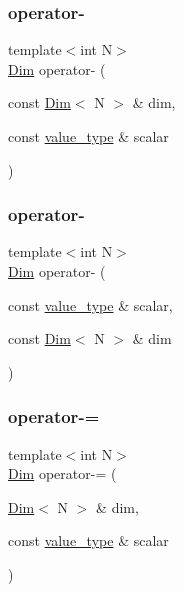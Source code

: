 \subsubsection{\texorpdfstring{operator-\/}{operator-}\hspace{0.1cm}{\footnotesize\ttfamily [1/2]}}
{\footnotesize\ttfamily template$<$int N$>$ \\
\hyperlink{structbc_1_1Dim}{Dim} operator-\/ (\begin{DoxyParamCaption}\item[{const \hyperlink{structbc_1_1Dim}{Dim}$<$ N $>$ \&}]{dim,  }\item[{const \hyperlink{structbc_1_1Dim_af59ff554825273cf6bd9619b2c78c196}{value\+\_\+type} \&}]{scalar }\end{DoxyParamCaption})\hspace{0.3cm}{\ttfamily [friend]}}

\mbox{\label{structbc_1_1Dim_aeec20ddee837bae3c689cb4ddab3a0cd}} 
\subsubsection{\texorpdfstring{operator-\/}{operator-}\hspace{0.1cm}{\footnotesize\ttfamily [2/2]}}
{\footnotesize\ttfamily template$<$int N$>$ \\
\hyperlink{structbc_1_1Dim}{Dim} operator-\/ (\begin{DoxyParamCaption}\item[{const \hyperlink{structbc_1_1Dim_af59ff554825273cf6bd9619b2c78c196}{value\+\_\+type} \&}]{scalar,  }\item[{const \hyperlink{structbc_1_1Dim}{Dim}$<$ N $>$ \&}]{dim }\end{DoxyParamCaption})\hspace{0.3cm}{\ttfamily [friend]}}

\mbox{\label{structbc_1_1Dim_add38db9cb6c5ca7444b9e4421d29ee3a}} 
\subsubsection{\texorpdfstring{operator-\/=}{operator-=}}
{\footnotesize\ttfamily template$<$int N$>$ \\
\hyperlink{structbc_1_1Dim}{Dim} operator-\/= (\begin{DoxyParamCaption}\item[{\hyperlink{structbc_1_1Dim}{Dim}$<$ N $>$ \&}]{dim,  }\item[{const \hyperlink{structbc_1_1Dim_af59ff554825273cf6bd9619b2c78c196}{value\+\_\+type} \&}]{scalar }\end{DoxyParamCaption})\hspace{0.3cm}{\ttfamily [friend]}}

